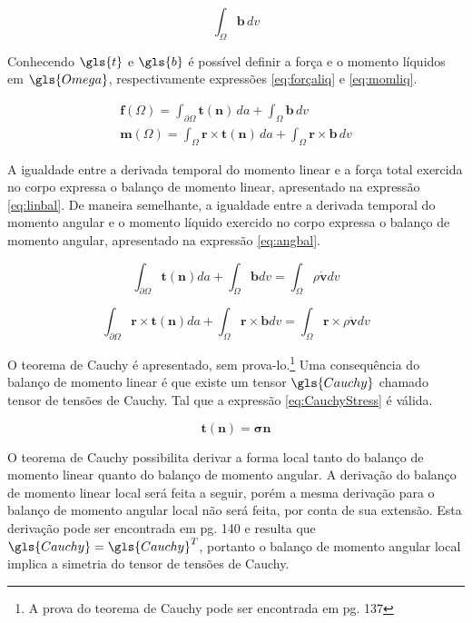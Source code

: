 \begin{equation}
    \int_{\Omega} \boldsymbol{b} \, dv
    \label{eq:forçavoltot}
\end{equation}

Conhecendo  $\gls{t}$ e $\gls{b}$ é possível definir a força e o momento líquidos em $ \gls{Omega}$, respectivamente expressões \ref{eq:forçaliq} e \ref{eq:momliq}.

\begin{align}
    \boldsymbol{f}(\Omega) = \int_{\partial \Omega} \boldsymbol{t(n)} \, da + \int_{\Omega} \boldsymbol{b} \, dv \label{eq:forçaliq} \\
    \boldsymbol{m}(\Omega) = \int_{\Omega} \boldsymbol{r} \times \boldsymbol{t(n)} \, da + \int_{\Omega} \boldsymbol{r} \times \boldsymbol{b} \, dv \label{eq:momliq}
\end{align}

A igualdade entre a derivada temporal do momento linear e a força total exercida no corpo expressa o balanço de momento linear, apresentado na expressão \ref{eq:linbal}. De maneira semelhante, a igualdade entre a derivada temporal do momento angular e o momento líquido exercido no corpo expressa o balanço de momento angular, apresentado na expressão \ref{eq:angbal}.

\begin{equation}
    \int_{\partial \Omega} \boldsymbol{t(n)} da + \int_{\Omega} \boldsymbol{b} dv = \int_{\Omega} \rho \dot{\boldsymbol{v}} dv \label{eq:linbal} 
\end{equation}

\begin{equation}
    \int_{\partial \Omega} \boldsymbol{r} \times \boldsymbol{t(n)} da + \int_{\Omega}    \boldsymbol{r} \times \boldsymbol{b} dv = \int_{\Omega} \boldsymbol{r} \times \rho \dot{\boldsymbol{v}} dv \label{eq:angbal} 
\end{equation}

O teorema de Cauchy é apresentado, sem prova-lo.\footnote{A prova do teorema de Cauchy pode ser encontrada em \cite{gurtin_fried_anand_2013} pg. 137} Uma consequência do balanço de momento linear é que existe um tensor $\gls{Cauchy}$ chamado tensor de tensões de Cauchy. Tal que a expressão \ref{eq:CauchyStress} é válida.

\begin{equation}
    \boldsymbol{t(n)} = \boldsymbol{\sigma n} \label{eq:CauchyStress}
\end{equation}

O teorema de Cauchy possibilita derivar a forma local tanto do balanço de momento linear quanto do balanço de momento angular. A derivação do balanço de momento linear local será feita a seguir, porém a mesma derivação para o balanço de momento angular local não será feita, por conta de sua extensão. Esta derivação pode ser encontrada em \cite{gurtin_fried_anand_2013} pg. 140 e resulta que $ \gls{Cauchy} = \gls{Cauchy}^T $, portanto o balanço de momento angular local implica a simetria do tensor de tensões de Cauchy. \par

